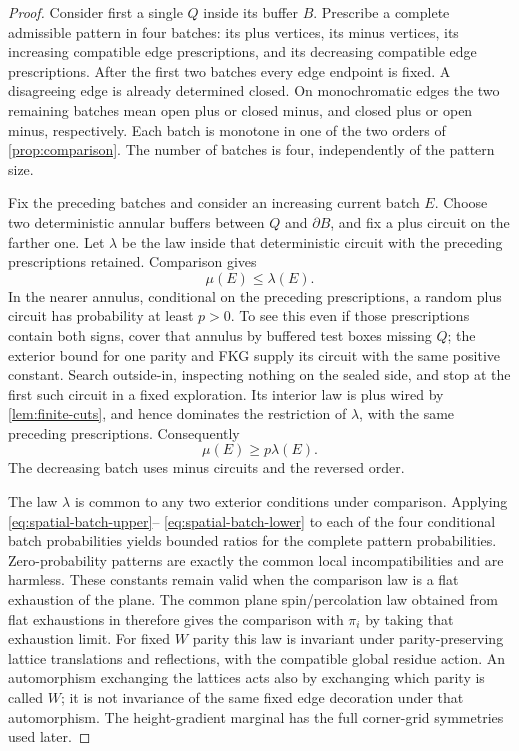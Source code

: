 \begin{proof}
Consider first a single $Q$ inside its buffer $B$. Prescribe a
complete admissible pattern in four batches: its plus vertices,
its minus vertices, its increasing compatible edge prescriptions,
and its decreasing compatible edge prescriptions. After the first
two batches every edge endpoint is fixed. A disagreeing edge is
already determined closed. On monochromatic edges the two remaining
batches mean open plus or closed minus, and closed plus or open
minus, respectively. Each batch is monotone in one of the two
orders of \cref{prop:comparison}. The number of batches is four,
independently of the pattern size.

Fix the preceding batches and consider an increasing current batch
$E$. Choose two deterministic annular buffers between $Q$ and
$\partial B$, and fix a plus circuit on the farther one. Let $\lambda$
be the law inside that deterministic circuit with the preceding
prescriptions retained. Comparison gives
\begin{equation}\label{eq:spatial-batch-upper}
                         \mu(E)\le\lambda(E).
\end{equation}
In the nearer annulus, conditional on the preceding prescriptions,
a random plus circuit has probability at least $p>0$. To see this
even if those prescriptions contain both signs, cover that annulus
by buffered test boxes missing $Q$; the exterior bound for one parity
and FKG supply its circuit with the same positive constant.
Search outside-in, inspecting nothing on the sealed side, and stop
at the first such circuit in a fixed exploration. Its interior
law is plus wired by \cref{lem:finite-cuts}, and hence dominates
the restriction of $\lambda$, with the same preceding prescriptions.
Consequently
\begin{equation}\label{eq:spatial-batch-lower}
                         \mu(E)\ge p\lambda(E).
\end{equation}
The decreasing batch uses minus circuits and the reversed order.

The law $\lambda$ is common to any two exterior conditions under
comparison. Applying \eqref{eq:spatial-batch-upper}--
\eqref{eq:spatial-batch-lower} to each of the four conditional batch
probabilities yields bounded ratios for the complete pattern
probabilities. Zero-probability patterns are exactly the common
local incompatibilities and are harmless. These constants remain
valid when the comparison law is a flat exhaustion of the plane.
The common plane spin/percolation law obtained from flat exhaustions in
\cite[Theorem~17.1]{DKLM2026} therefore gives the comparison with
$\pi_i$ by taking that exhaustion limit. For fixed $W$ parity this
law is invariant under parity-preserving lattice translations and
reflections, with the compatible global residue action. An
automorphism exchanging the lattices acts also by exchanging which
parity is called $W$; it is not invariance of the same fixed edge
decoration under that automorphism. The height-gradient marginal
has the full corner-grid symmetries used later.


\end{proof}
